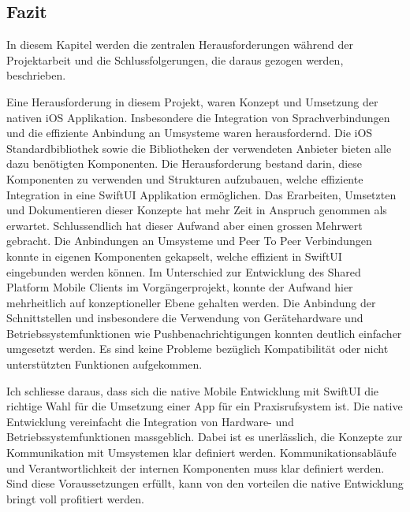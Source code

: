 \subsection{Fazit}

In diesem Kapitel werden die zentralen Herausforderungen während der Projektarbeit und die Schlussfolgerungen, die daraus gezogen werden, beschrieben.

Eine Herausforderung in diesem Projekt, waren Konzept und Umsetzung der nativen iOS Applikation.
Insbesondere die Integration von Sprachverbindungen und die effiziente Anbindung an Umsysteme waren herausfordernd.
Die iOS Standardbibliothek sowie die Bibliotheken der verwendeten Anbieter bieten alle dazu benötigten Komponenten.
Die Herausforderung bestand darin, diese Komponenten zu verwenden und Strukturen aufzubauen, welche effiziente Integration in eine SwiftUI Applikation ermöglichen.
Das Erarbeiten, Umsetzten und Dokumentieren dieser Konzepte hat mehr Zeit in Anspruch genommen als erwartet.
Schlussendlich hat dieser Aufwand aber einen grossen Mehrwert gebracht.
Die Anbindungen an Umsysteme und Peer To Peer Verbindungen konnte in eigenen Komponenten gekapselt, welche effizient in SwiftUI eingebunden werden können.
Im Unterschied zur Entwicklung des Shared Platform Mobile Clients im Vorgängerprojekt, konnte der Aufwand hier mehrheitlich auf konzeptioneller Ebene gehalten werden.
Die Anbindung der Schnittstellen und insbesondere die Verwendung von Gerätehardware und Betriebssystemfunktionen wie Pushbenachrichtigungen konnten deutlich einfacher umgesetzt werden.
Es sind keine Probleme bezüglich Kompatibilität oder nicht unterstützten Funktionen aufgekommen.

Ich schliesse daraus, dass sich die native Mobile Entwicklung mit SwiftUI die richtige Wahl für die Umsetzung einer App für ein Praxisrufsystem ist.
Die native Entwicklung vereinfacht die Integration von Hardware- und Betriebssystemfunktionen massgeblich.
Dabei ist es unerlässlich, die Konzepte zur Kommunikation mit Umsystemen klar definiert werden.
Kommunikationsabläufe und Verantwortlichkeit der internen Komponenten muss klar definiert werden.
Sind diese Voraussetzungen erfüllt, kann von den vorteilen die native Entwicklung bringt voll profitiert werden.

